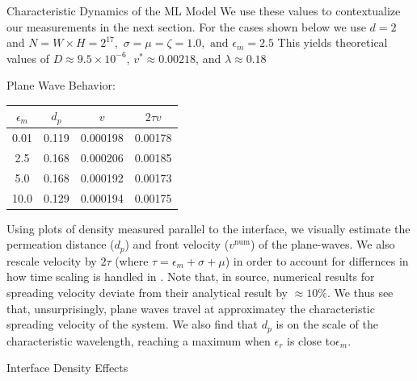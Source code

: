 \documentclass{beamer}
\begin{document}
\begin{frame}{}
\begin{textblock}{0.32}
\begin{block}{Characteristic Dynamics of the ML Model}
        We use these values to contextualize our measurements in the next section.
        For the cases shown below we use $d=2$ and $N = W \times H = 2^{17},$ 
        $\sigma = \mu = \zeta = 1.0 , \text{ and } \epsilon_m = 2.5$
        This yields theoretical values of $D \approx 9.5 \times 10^{-6}$, $ v^* 
        \approx 0.00218$, and $ \lambda \approx 0.18$
    \end{block}
    \begin{block}{Plane Wave Behavior:}
        \begin{center}
            \begin{tabular}{c|c|c|c}
                $\epsilon_m$    & $d_p$ & $v$       & $2 \tau v$ \\
                \hline 
                0.01            & 0.119 & 0.000198  & 0.00178\\
                2.5             & 0.168 & 0.000206  & 0.00185\\
                5.0             & 0.168 & 0.000192  & 0.00173\\
                10.0            & 0.129 & 0.000194  & 0.00175\\
            \end{tabular}
        \end{center}
        Using plots of density measured parallel to the interface, we visually
        estimate the permeation distance ($d_p$) and front velocity ($v^\text{num}$)
        of the plane-waves. We also rescale velocity by $2 \tau$ (where $\tau = \epsilon_m + \sigma + \mu$)
        in order to account for differnces in how time scaling is handled in \cite{reichenbach08}.
        Note that, in source, numerical results for spreading velocity deviate from
        their analytical result by $ \approx 10 \%$. We thus see that, unsurprisingly,
        plane waves travel at approximatey the characteristic spreading velocity of 
        the system. We also find that $d_p$ is on the scale of the characteristic 
        wavelength, reaching a maximum when $\epsilon_r$ is close to$\epsilon_m$. 
    \end{block}
    \begin{block}{Interface Density Effects}
        \begin{figure}[h]
            \centering

\end{figure}
\end{block}
\end{textblock}
\end{frame}
\end{document}
